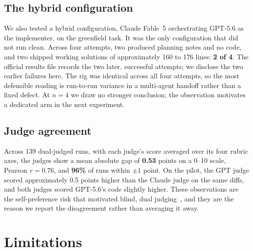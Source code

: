 \documentclass[11pt]{article}
\newcommand{\fable}{Claude Fable~5}
\newcommand{\sol}{GPT-5.6}
\begin{document}
\subsection{The hybrid configuration}
\label{sec:hybrid}

We also tested a hybrid configuration, \fable{} orchestrating \sol{} as the
implementer, on the greenfield task. It was the only configuration that did
not run clean. Across four attempts, two produced planning notes and no
code, and two shipped working solutions of approximately 160 to 176 lines:
\textbf{2 of 4}. The official results file records the two later,
successful attempts; we disclose the two earlier failures here. The rig was
identical across all four attempts, so the most defensible reading is
run-to-run variance in a multi-agent handoff rather than a fixed defect. At
$n=4$ we draw no stronger conclusion; the observation motivates a dedicated
arm in the next experiment.

\subsection{Judge agreement}
\label{sec:judges}

Across 139 dual-judged runs, with each judge's score averaged over its four
rubric axes, the judges show a mean absolute gap of \textbf{0.53} points on
a 0--10 scale, Pearson $r = 0.76$, and \textbf{96\%} of runs within
$\pm 1$ point. On the pilot, the GPT judge scored approximately 0.5 points
higher than the Claude judge on the same diffs, and both judges scored
\sol{}'s code slightly higher. These observations are the self-preference
risk that motivated blind, dual judging~\cite{wataoka2024selfpreference},
and they are the reason we report the disagreement rather than averaging it
away.

\section{Limitations}
\end{document}
